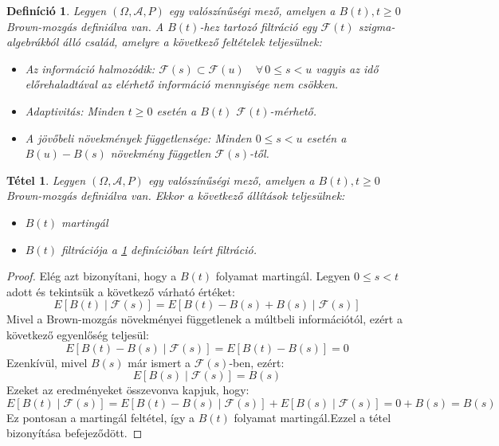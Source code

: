 \documentclass[12pt, a4paper]{article}
\newtheorem{definition}{Definíció}[subsection]
\newtheorem{theorem}{Tétel}[subsection]
\begin{document}
\begin{definition}\label{def_tizenkettedik}
\cite{shreve2004} Legyen $(\Omega, \mathcal{A}, P)$ egy valószínűségi mező, amelyen a $B(t), t \ge 0$ Brown-mozgás definiálva van. A $B(t)$-hez tartozó filtráció egy $\mathcal{F}(t)$ szigma-algebrákból álló család, amelyre a következő feltételek teljesülnek:
\begin{itemize}
    \item Az információ halmozódik: $\mathcal{F}(s) \subset \mathcal{F}(u) \quad \forall\, 0 \le s < u$ vagyis az idő előrehaladtával az elérhető információ mennyisége nem csökken.
    \item Adaptivitás: Minden $t \ge 0$ esetén a $B(t)$ $\mathcal{F}(t)$-mérhető.
    \item A jövőbeli növekmények függetlensége: Minden $0 \le s < u$ esetén a $B(u)-B(s)$ növekmény független $\mathcal{F}(s)$-től.
\end{itemize}
\end{definition}

\begin{theorem}\label{thm_elso}
\cite{shreve2004} Legyen $(\Omega, \mathcal{A}, P)$ egy valószínűségi mező, amelyen a $B(t), t \ge 0$ Brown-mozgás definiálva van. Ekkor a következő állítások teljesülnek:
\begin{itemize}
    \item $B(t)$ martingál
    \item $B(t)$ filtrációja a \ref{def_tizenkettedik} definícióban leírt filtráció.
\end{itemize}
\end{theorem}

\begin{proof}
Elég azt bizonyítani, hogy a $B(t)$ folyamat martingál. Legyen $0 \le s < t$ adott és tekintsük a következő várható értéket:
\[
E[B(t) \mid \mathcal{F}(s)] = E[B(t) - B(s) + B(s) \mid \mathcal{F}(s)]
\]
Mivel a Brown-mozgás növekményei függetlenek a múltbeli információtól, ezért a következő egyenlőség teljesül:
\[
E[B(t) - B(s) \mid \mathcal{F}(s)] = E[B(t) - B(s)] = 0
\]
Ezenkívül, mivel $B(s)$ már ismert a $\mathcal{F}(s)$-ben, ezért:
\[
E[B(s) \mid \mathcal{F}(s)] = B(s)
\]
Ezeket az eredményeket összevonva kapjuk, hogy:
\[
E[B(t) \mid \mathcal{F}(s)] = E[B(t) - B(s) \mid \mathcal{F}(s)] + E[B(s) \mid \mathcal{F}(s)] = 0 + B(s) = B(s)
\]
Ez pontosan a martingál feltétel, így a $B(t)$ folyamat martingál.Ezzel a tétel bizonyítása befejeződött.
\end{proof}
\newpage
\end{document}
